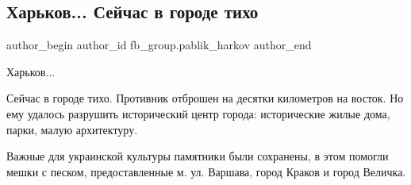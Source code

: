  
 
 
 
 
 
\subsection{Харьков... Сейчас в городе тихо}
\label{sec:14_05_2022.fb.fb_group.pablik_harkov.1.harkov_tiho}
 
\ifcmt
 author_begin
   author_id fb_group.pablik_harkov
 author_end
\fi

Харьков...

Сейчас в городе тихо. Противник отброшен на десятки километров на восток. Но
ему удалось разрушить исторический центр города: исторические жилые дома,
парки, малую архитектуру.


Важные для украинской культуры памятники были сохранены, в этом помогли мешки с
песком, предоставленные м. ул. Варшава, город Краков и город Величка.

